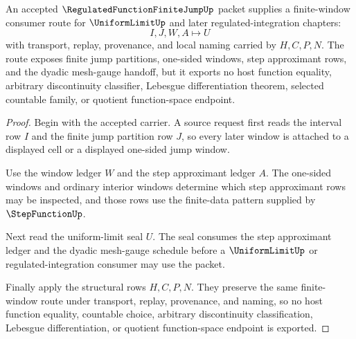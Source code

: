 \begin{theorem}
\label{thm:regulated-function-finite-jump-uniform-limit-consumer}
An accepted $\RegulatedFunctionFiniteJumpUp$ packet supplies a finite-window consumer route for $\UniformLimitUp$ and later regulated-integration chapters:
$$
I,J,W,A \longmapsto U
$$
with transport, replay, provenance, and local naming carried by $H,C,P,N$. The route exposes finite jump partitions, one-sided windows, step approximant rows, and the dyadic mesh-gauge handoff, but it exports no host function equality, arbitrary discontinuity classifier, Lebesgue differentiation theorem, selected countable family, or quotient function-space endpoint.
\end{theorem}
\begin{proof}
Begin with the accepted carrier. A source request first reads the interval row $I$ and the finite jump partition row $J$, so every later window is attached to a displayed cell or a displayed one-sided jump window.

Use the window ledger $W$ and the step approximant ledger $A$. The one-sided windows and ordinary interior windows determine which step approximant rows may be inspected, and those rows use the finite-data pattern supplied by $\StepFunctionUp$.

Next read the uniform-limit seal $U$. The seal consumes the step approximant ledger and the dyadic mesh-gauge schedule before a $\UniformLimitUp$ or regulated-integration consumer may use the packet.

Finally apply the structural rows $H,C,P,N$. They preserve the same finite-window route under transport, replay, provenance, and naming, so no host function equality, countable choice, arbitrary discontinuity classification, Lebesgue differentiation, or quotient function-space endpoint is exported.
\end{proof}



